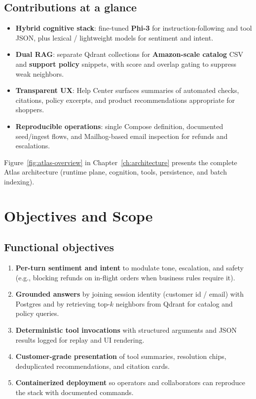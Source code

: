 \documentclass[11pt,a4paper,twoside]{report}
\begin{document}
\section{Contributions at a glance}
\begin{itemize}
\item \textbf{Hybrid cognitive stack}: fine-tuned \textbf{Phi-3} for instruction-following and tool JSON, plus lexical / lightweight models for sentiment and intent.
\item \textbf{Dual RAG}: separate Qdrant collections for \textbf{Amazon-scale catalog} CSV and \textbf{support policy} snippets, with score and overlap gating to suppress weak neighbors.
\item \textbf{Transparent UX}: Help Center surfaces summaries of automated checks, citations, policy excerpts, and product recommendations appropriate for shoppers.
\item \textbf{Reproducible operations}: single Compose definition, documented seed/ingest flows, and Mailhog-based email inspection for refunds and escalations.
\end{itemize}

Figure~\ref{fig:atlas-overview} in Chapter~\ref{ch:architecture} presents the complete Atlas architecture (runtime plane, cognition, tools, persistence, and batch indexing).

\chapter{Objectives and Scope}

\section{Functional objectives}
\begin{enumerate}
\item \textbf{Per-turn sentiment and intent} to modulate tone, escalation, and safety (e.g., blocking refunds on in-flight orders when business rules require it).
\item \textbf{Grounded answers} by joining session identity (customer id / email) with Postgres and by retrieving top-$k$ neighbors from Qdrant for catalog and policy queries.
\item \textbf{Deterministic tool invocations} with structured arguments and JSON results logged for replay and UI rendering.
\item \textbf{Customer-grade presentation} of tool summaries, resolution chips, deduplicated recommendations, and citation cards.
\item \textbf{Containerized deployment} so operators and collaborators can reproduce the stack with documented commands.
\end{enumerate}
\end{document}
